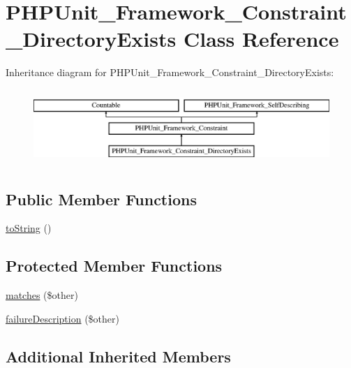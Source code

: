 \hypertarget{class_p_h_p_unit___framework___constraint___directory_exists}{}\section{P\+H\+P\+Unit\+\_\+\+Framework\+\_\+\+Constraint\+\_\+\+Directory\+Exists Class Reference}
\label{class_p_h_p_unit___framework___constraint___directory_exists}
Inheritance diagram for P\+H\+P\+Unit\+\_\+\+Framework\+\_\+\+Constraint\+\_\+\+Directory\+Exists\+:\begin{figure}[H]
\begin{center}
\leavevmode
\includegraphics[height=2.876712cm]{class_p_h_p_unit___framework___constraint___directory_exists}
\end{center}
\end{figure}
\subsection*{Public Member Functions}
\begin{DoxyCompactItemize}
\item 
\mbox{\hyperlink{class_p_h_p_unit___framework___constraint___directory_exists_a5558c5d549f41597377fa1ea8a1cefa3}{to\+String}} ()
\end{DoxyCompactItemize}
\subsection*{Protected Member Functions}
\begin{DoxyCompactItemize}
\item 
\mbox{\hyperlink{class_p_h_p_unit___framework___constraint___directory_exists_a9c9c337de483bbdbb9fa249a6c7c9cc5}{matches}} (\$other)
\item 
\mbox{\hyperlink{class_p_h_p_unit___framework___constraint___directory_exists_aaabb679273bfb812df4d81c283754a59}{failure\+Description}} (\$other)
\end{DoxyCompactItemize}
\subsection*{Additional Inherited Members}


